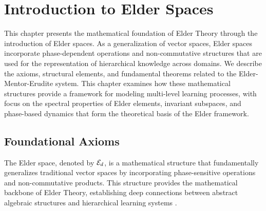 \chapter{Introduction to Elder Spaces}

\begin{chapterabstract}
This chapter presents the mathematical foundation of Elder Theory through the introduction of Elder spaces. As a generalization of vector spaces, Elder spaces incorporate phase-dependent operations and non-commutative structures that are used for the representation of hierarchical knowledge across domains. We describe the axioms, structural elements, and fundamental theorems related to the Elder-Mentor-Erudite system. This chapter examines how these mathematical structures provide a framework for modeling multi-level learning processes, with focus on the spectral properties of Elder elements, invariant subspaces, and phase-based dynamics that form the theoretical basis of the Elder framework.
\end{chapterabstract}

\section{Foundational Axioms}

The Elder space, denoted by $\mathcal{E}_{d}$, is a mathematical structure that fundamentally generalizes traditional vector spaces by incorporating phase-sensitive operations and non-commutative products. This structure provides the mathematical backbone of Elder Theory, establishing deep connections between abstract algebraic structures and hierarchical learning systems \cite{elder_theory}.

